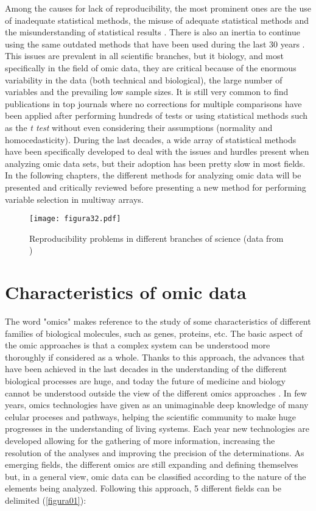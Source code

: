 Among the causes for lack of reproducibility, the most prominent ones are the use of inadequate statistical methods, the misuse of adequate statistical methods and the misunderstanding of statistical results \parencite{ioannidis2017statistical, gagnier2017misconceptions, diong2018poor}. There is also an inertia to continue using the same outdated methods that have been used during the last 30 years \parencite{leek2017five}. This issues are prevalent in all scientific branches, but it biology, and most specifically in the field of omic data, they are critical because of the enormous variability in the data (both technical and biological), the large number of variables and the prevailing low sample sizes. It is still very common to find publications in top journals where no corrections for multiple comparisons have been applied after performing hundreds of tests or using statistical methods such as the \textit{t test} without even considering their assumptions (normality and homocedasticity). During the last decades, a wide array of statistical methods have been specifically developed to deal with the issues and hurdles present when analyzing omic data sets, but their adoption has been pretty slow in most fields. In the following chapters, the different methods for analyzing omic data will be presented and critically reviewed before presenting a new method for performing variable selection in multiway arrays.

\begin{figure}[hbtp]
	\centering
\texttt{[image: figura32.pdf]}
\caption{Reproducibility problems in different branches of science (data from \cite{baker20161})}
\label{figura32}
\end{figure}

\section{Characteristics of omic data}
\label{sec:charomicdata}
The word "omics" makes reference to the study of some characteristics of different families of biological molecules, such as genes, proteins, etc. The basic aspect of the omic approaches is that a complex system can be understood more thoroughly if considered as a whole. Thanks to this approach, the advances that have been achieved in the last decades in the understanding of the different biological processes are huge, and today the future of medicine and biology cannot be understood outside the view of the different omics approaches \parencite{van2018role}. In few years, omics technologies have given as an unimaginable deep knowledge of many celular proceses and pathways, helping the scientific community to make huge progresses in the understanding of living systems. Each year new technologies are developed allowing for the gathering of more information, increasing the resolution of the analyses and improving the precision of the determinations. As emerging fields, the different omics are still expanding and defining themselves but, in a general view, omic data can be classified according to the nature of the elements being analyzed. Following this approach, 5 different fields can be delimited (\autoref{figura01}):

